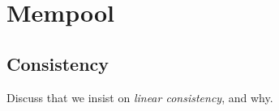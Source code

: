\chapter{Mempool}
\label{mempool}

\section{Consistency}
\label{mempool:consistency}

Discuss that we insist on \emph{linear consistency}, and why.
